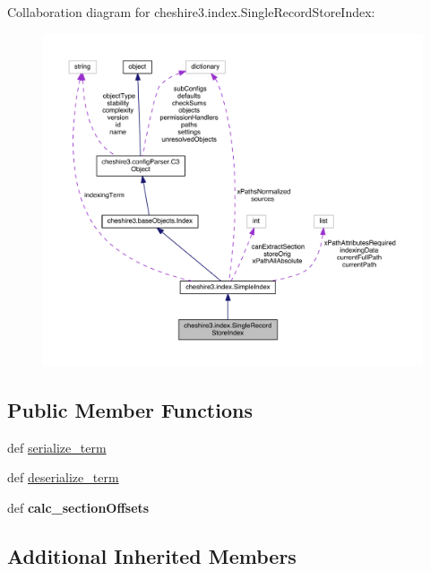 Collaboration diagram for cheshire3.\-index.\-Single\-Record\-Store\-Index\-:
\nopagebreak
\begin{figure}[H]
\begin{center}
\leavevmode
\includegraphics[width=350pt]{classcheshire3_1_1index_1_1_single_record_store_index__coll__graph}
\end{center}
\end{figure}
\subsection*{Public Member Functions}
\begin{DoxyCompactItemize}
\item 
def \hyperlink{classcheshire3_1_1index_1_1_single_record_store_index_af9f201315e0e4ccc9cc13a0f6ebb6709}{serialize\-\_\-term}
\item 
def \hyperlink{classcheshire3_1_1index_1_1_single_record_store_index_aa7d15a6c253b7b8f6e8f9d316dfcf316}{deserialize\-\_\-term}
\item 
\hypertarget{classcheshire3_1_1index_1_1_single_record_store_index_acb2d8b41f6741836a0be43603499ea73}{def {\bfseries calc\-\_\-section\-Offsets}}\label{classcheshire3_1_1index_1_1_single_record_store_index_acb2d8b41f6741836a0be43603499ea73}

\end{DoxyCompactItemize}
\subsection*{Additional Inherited Members}



